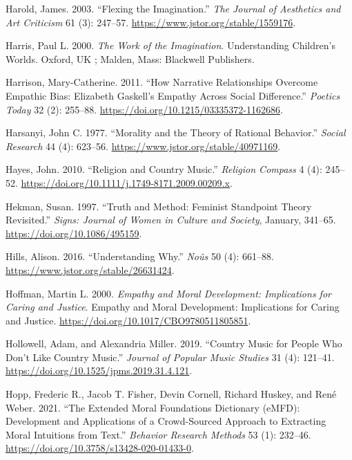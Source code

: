 \documentclass[12pt]{book}
\newenvironment{CSLReferences}%
  {\setlength{\parindent}{0pt}%
   \setlength{\leftskip}{0pt}%
   \setlength{\parskip}{0pt}}%
  {\par}
\theoremstyle{definition}
\theoremstyle{remark}
\begin{document}
\begin{CSLReferences}{1}{0}
Harold, James. 2003. {``Flexing the {Imagination}.''} \emph{The Journal of Aesthetics and Art Criticism} 61 (3): 247--57. \url{https://www.jstor.org/stable/1559176}.

Harris, Paul L. 2000. \emph{The {Work} of the {Imagination}}. Understanding {Children}'s {Worlds}. Oxford, UK ; Malden, Mass: Blackwell Publishers.

Harrison, Mary-Catherine. 2011. {``How {Narrative Relationships Overcome Empathic Bias}: {Elizabeth Gaskell}'s {Empathy} Across {Social Difference}.''} \emph{Poetics Today} 32 (2): 255--88. \url{https://doi.org/10.1215/03335372-1162686}.

Harsanyi, John C. 1977. {``Morality and the {Theory} of {Rational Behavior}.''} \emph{Social Research} 44 (4): 623--56. \url{https://www.jstor.org/stable/40971169}.

Hayes, John. 2010. {``Religion and {Country Music}.''} \emph{Religion Compass} 4 (4): 245--52. \url{https://doi.org/10.1111/j.1749-8171.2009.00209.x}.

Hekman, Susan. 1997. {``Truth and Method: {Feminist} Standpoint Theory Revisited.''} \emph{Signs: Journal of Women in Culture and Society}, January, 341--65. \url{https://doi.org/10.1086/495159}.

Hills, Alison. 2016. {``Understanding {Why}.''} \emph{Noûs} 50 (4): 661--88. \url{https://www.jstor.org/stable/26631424}.

Hoffman, Martin L. 2000. \emph{Empathy and Moral Development: {Implications} for Caring and Justice}. Empathy and Moral Development: {Implications} for Caring and Justice. \url{https://doi.org/10.1017/CBO9780511805851}.

Hollowell, Adam, and Alexandria Miller. 2019. {``Country {Music} for {People Who Don}'t {Like Country Music}.''} \emph{Journal of Popular Music Studies} 31 (4): 121--41. \url{https://doi.org/10.1525/jpms.2019.31.4.121}.

Hopp, Frederic R., Jacob T. Fisher, Devin Cornell, Richard Huskey, and René Weber. 2021. {``The Extended {Moral Foundations Dictionary} ({eMFD}): {Development} and Applications of a Crowd-Sourced Approach to Extracting Moral Intuitions from Text.''} \emph{Behavior Research Methods} 53 (1): 232--46. \url{https://doi.org/10.3758/s13428-020-01433-0}.


\end{CSLReferences}
\end{document}
